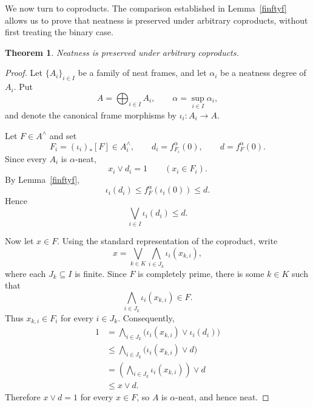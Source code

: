 \documentclass[11pt]{amsart}
\theoremstyle{plain}
\newtheorem{thm}{Theorem}[section]
\theoremstyle{definition}
\begin{document}
We now turn to coproducts. The comparison
established in Lemma~\ref{finftyf} allows us to prove
that neatness is preserved under arbitrary
coproducts, without first treating the
binary case.

\begin{thm}\label{coprodE}
Neatness is preserved under arbitrary
coproducts.
\end{thm}

\begin{proof}
Let $\{A_i\}_{i\in I}$ be a family of neat
frames, and let $\alpha_i$ be a neatness
degree of $A_i$. Put
\[
A=\bigoplus_{i\in I}A_i,
\qquad
\alpha=\sup_{i\in I}\alpha_i,
\]
and denote the canonical frame morphisms
by $\iota_i:A_i\to A$.

Let $F\in A^\wedge$ and set
\[
F_i=(\iota_i)_*[F]\in A_i^\wedge,
\qquad
d_i=f_{F_i}^{\alpha}(0),
\qquad
d=f_F^{\alpha}(0).
\]
Since every $A_i$ is $\alpha$-neat,
\[
x_i\vee d_i=1
\qquad(x_i\in F_i).
\]
By Lemma~\ref{finftyf},
\[
\iota_i(d_i)
\leq f_F^\alpha(\iota_i(0))
\leq d.
\]
Hence
\[
\bigvee_{i\in I}\iota_i(d_i)\leq d.
\]

Now let $x\in F$. Using the standard
representation of the coproduct, write
\[
x=\bigvee_{k\in K}
\bigwedge_{i\in J_k}\iota_i(x_{k,i}),
\]
where each $J_k\subseteq I$ is finite.
Since $F$ is completely prime, there is
some $k\in K$ such that
\[
\bigwedge_{i\in J_k}\iota_i(x_{k,i})\in F.
\]
Thus $x_{k,i}\in F_i$ for every $i\in J_k$.
Consequently,
\[
\begin{aligned}
1
&=\bigwedge_{i\in J_k}
  \bigl(\iota_i(x_{k,i})\vee\iota_i(d_i)\bigr)\\
&\leq
  \bigwedge_{i\in J_k}
  \bigl(\iota_i(x_{k,i})\vee d\bigr)\\
&=
  \left(\bigwedge_{i\in J_k}
  \iota_i(x_{k,i})\right)\vee d\\
&\leq x\vee d.
\end{aligned}
\]
Therefore $x\vee d=1$ for every $x\in F$,
so $A$ is $\alpha$-neat, and hence neat.
\end{proof}
\end{document}
